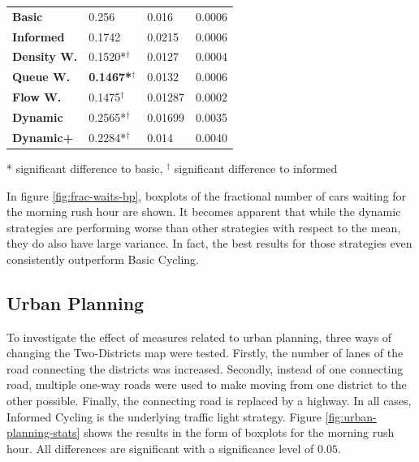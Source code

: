 \documentclass[11pt]{article}
\begin{document}
\begin{table}[h]
\begin{tabular}{l|l|l|l|}
\hline\textbf{Basic}      & 0.256           & 0.016             & 0.0006                     \\
\textbf{Informed}   & 0.1742          & 0.0215            & 0.0006                     \\
\hline\textbf{Density W.} & 0.1520*$^\dagger$          & 0.0127            & 0.0004                     \\
\textbf{Queue W.}   & \textbf{0.1467*$^\dagger$} & 0.0132            & 0.0006                     \\
\textbf{Flow W.}    & 0.1475$^\dagger$          & 0.01287           & 0.0002                     \\
\textbf{Dynamic}    & 0.2565*$^\dagger$          & 0.01699           & 0.0035                     \\
\textbf{Dynamic+}   & 0.2284*$^\dagger$          & 0.014             & 0.0040                    
\end{tabular}

\small{* significant difference to basic, $^\dagger$ significant difference to informed}
\end{table}

\vspace{20pt}

In figure \ref{fig:frac-waits-bp}, boxplots of the fractional number of cars waiting for the morning rush hour are shown. It becomes apparent that while the dynamic strategies are performing worse than other strategies with respect to the mean, they do also have large variance. In fact, the best results for those strategies even consistently outperform Basic Cycling.

\subsection{Urban Planning}
To investigate the effect of measures related to urban planning, three ways of changing the Two-Districts map were tested. Firstly, the number of lanes of the road connecting the districts was increased. Secondly, instead of one connecting road, multiple one-way roads were used to make moving from one district to the other possible. Finally, the connecting road is replaced by a highway. In all cases, Informed Cycling is the underlying traffic light strategy. Figure \ref{fig:urban-planning-stats} shows the results in the form of boxplots for the morning rush hour. All differences are significant with a significance level of $0.05$.
\end{document}
